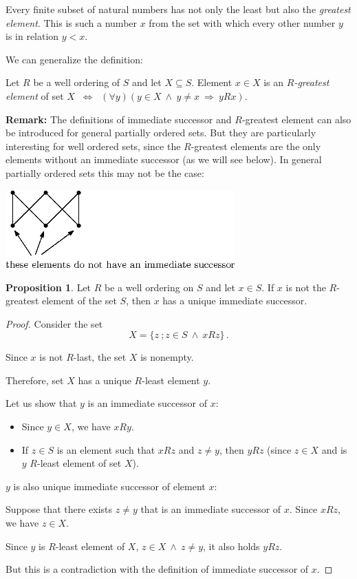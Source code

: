\documentclass[11pt,paper=b5,footinclude,headinclude]{scrbook} %
\def\inn {{~\wedge~}}
\def\sledi {{~\Rightarrow~}}
\def\cee {{~\Leftrightarrow~}}
\theoremstyle{remark}
\theoremstyle{definition} %
\theoremstyle{theorem} %
\newtheorem*{proposition}{Proposition}
\begin{document}
\bigskip
Every finite subset of natural numbers has not only the least but also the {\em greatest element}.
This is such a number $x$ from the set with which every other number $y$ is in relation $y<x$.

\medskip
We can generalize the definition:

Let $R$ be a well ordering of $S$ and let $X\subseteq S$.
Element $x\in X$ is an  {\em $R$-greatest element} of set $X$ $\cee$ $(\forall y)(y\in X\inn y\neq x\sledi yRx)$.

\bigskip

\textbf{ Remark:}
The definitions of immediate successor and $R$-greatest element can also be introduced for general partially ordered sets.
But they are particularly interesting for well ordered sets, since the $R$-greatest elements are the only elements without an immediate
successor (as we will see below).
In general partially ordered sets this may not be the case:
\begin{center}
\includegraphics[height=30mm]{Hasse3-en.eps}
\end{center}

\bigskip
\begin{proposition}
Let $R$ be a well ordering on $S$ and let $x\in S$. If $x$ is not the  $R$-greatest element of the set $S$, then $x$
has a unique immediate successor.
\end{proposition}

\begin{proof}
Consider the set
$$X = \{z~;z\in S\inn xRz\}\,.$$

Since $x$ is not $R$-last, the set $X$ is nonempty.

Therefore, set $X$ has a unique $R$-least element $y$.

Let us show that $y$ is an immediate successor of $x$:
\begin{itemize}
  \item Since $y\in X$, we have $xRy$.
  \item If $z\in S$ is an element such that $xRz$ and $z\neq y$, then
$yRz$ (since $z\in X$ and  is $y$ $R$-least  element of set $X$).
\end{itemize}

$y$ is also unique immediate successor of element $x$:

Suppose that there exists $z\neq y$ that is an immediate successor of $x$.
Since $xRz$, we have  $z\in X$.

Since $y$ is $R$-least element of  $X$, $z\in X\inn z\neq y$,
it also holds $yRz$.

But this is a contradiction with the definition of immediate successor of $x$.
\end{proof}
\end{document}
